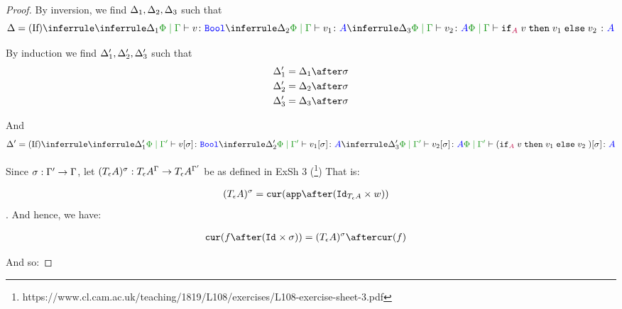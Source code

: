 \documentclass{report}
\begin{document}
\begin{framed}
\begin{proof}
        \case{\vif}
        
        
        By inversion, we find $\Delta_1, \Delta_2, \Delta_3$ such that
        \begin{equation}
            \D = \ntreeruleIII{\vif}{\treeruleI{\D_1}{\etyperelation{\P}{\G}{v}{\B}}}{\treeruleI{\D_2}{\etyperelation{\P}{\G}{v_1}{A}}}{\treeruleI{\D_3}{\etyperelation{\P}{\G}{v_2}{A}}}{\etyperelation{\P}{\G}{\pifthenelse{A}{v}{v_1}{v_2}}{A}}
        \end{equation}
        
        By induction we find $\Delta_1', \Delta_2', \Delta_3'$ such that 
        \begin{align*}
            \D_1' &= \D_1\after\si\\
            \D_2' &= \D_2\after\si\\
            \D_3' &= \D_3\after\si\\
        \end{align*}
        
        And
        \begin{equation}
            \D' = \ntreeruleIII{\vif}{\treeruleI{\D_1'}{\etyperelation{\P}{\G'}{v\ssi}{\B}}}{\treeruleI{\D_2'}{\etyperelation{\P}{\G'}{v_1\ssi}{A}}}{\treeruleI{\D_3'}{\etyperelation{\P}{\G'}{v_2\ssi}{A}}}{\etyperelation{\P}{\G'}{(\pifthenelse{A}{v}{v_1}{v_2})\ssi}{A}}
        \end{equation}
        
        Since $\sigma: \Gamma' \rightarrow \Gamma$, let $(T_{\epsilon}{A})^{\sigma}: T_{\epsilon}{A}^{\Gamma}\rightarrow T_{\epsilon}{A}^{\Gamma'}$ be as defined in ExSh 3 (\footnote{https://www.cl.cam.ac.uk/teaching/1819/L108/exercises/L108-exercise-sheet-3.pdf})
        That is:
        
        \begin{align*}
            (\tea)^{\si} & = \cur{\app\after(\Id{\tea}\times w)}
        \end{align*}.
        And hence, we have:
        
        \begin{align*}
            \cur{f\after(\Id{}\times \si)} & = (\tea)^{\si} \after\cur{f}
        \end{align*}
        
        And so:
        

\end{proof}
\end{framed}
\end{document}
